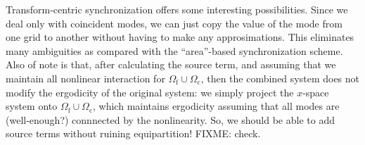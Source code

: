 \documentclass[10pt,showpacs,showkeys,%
amsfonts,amsmath,onecolumn,
floatfix,aps,superscriptaddress]{revtex4}
\begin{document}
Transform-centric synchronization offers some interesting possibilities.
Since we deal only with coincident modes, we can just copy the value 
of the mode from one grid to another without having to make any
approsimations.  This eliminates many ambiguities as compared with the
``area''-based synchronization scheme. Also of note is that, after
calculating the source term, and assuming that we maintain all nonlinear
interaction for $\Omega_{\text{f}} \cup \Omega_{\text{c}}$, then the 
combined system does not modify the ergodicity of the original system:
we simply project the $x$-space system onto 
$\Omega_{\text{f}} \cup \Omega_{\text{c}}$, which maintains ergodicity
assuming that all modes are (well-enough?) connnected by the nonlinearity.
So, we should be able to add source terms without ruining equipartition!
FIXME: check.
\end{document}
